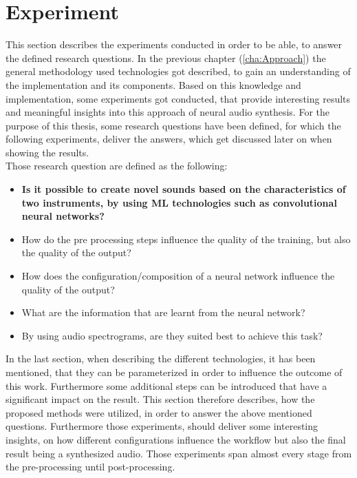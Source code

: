 \chapter{Experiment}
\label{cha:Experiment}
This section describes the experiments conducted in order to be able, to answer the defined research questions. In the previous chapter (\ref{cha:Approach}) the general methodology used technologies got described, to gain an understanding of the implementation and its components. Based on this knowledge and implementation, some experiments got conducted, that provide interesting results and meaningful insights into this approach of neural audio synthesis. For the purpose of this thesis, some research questions have been defined, for which the following experiments, deliver the answers, which get discussed later on when showing the results.\\

\noindent Those research question are defined as the following:

\begin{itemize}
    \item \textbf{Is it possible to create novel sounds based on the characteristics of two instruments, by using ML technologies such as convolutional neural networks?}

    \item How do the pre processing steps influence the quality of the training, but also the quality of the output?

    \item How does the configuration/composition of a neural network influence the quality of the output?

    \item What are the information that are learnt from the neural network?

    \item By using audio spectrograms, are they suited best to achieve this task?
\end{itemize}

In the last section, when describing the different technologies, it has been mentioned, that they can be parameterized in order to influence the outcome of this work. Furthermore some additional steps can be introduced that have a significant impact on the result. This section therefore describes, how the proposed methods were utilized, in order to answer the above mentioned questions. Furthermore those experiments, should deliver some interesting insights, on how different configurations influence the workflow but also the final result being a synthesized audio. Those experiments span almost every stage from the pre-processing until post-processing. 

